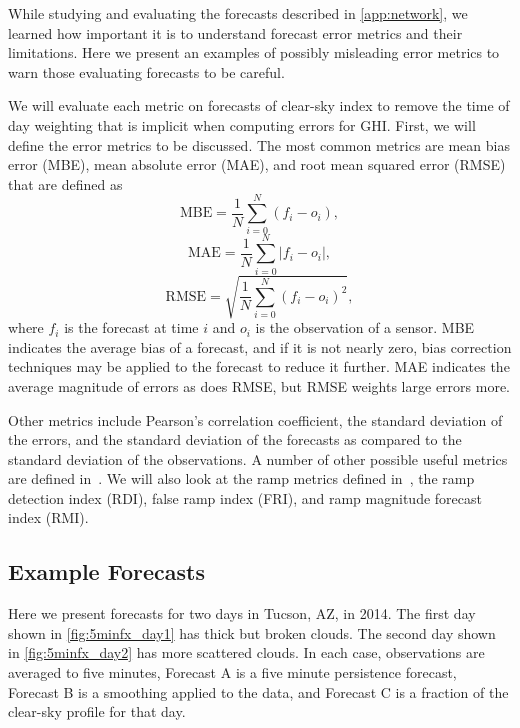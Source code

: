 While studying and evaluating the forecasts described in
\cref{app:network}, we learned how important it is to understand
forecast error metrics and their limitations.
Here we present an examples of possibly misleading error metrics to
warn those evaluating forecasts to be careful.

We will evaluate each metric on forecasts of clear-sky index to remove
the time of day weighting that is implicit when computing errors for
GHI.
First, we will define the error metrics to be discussed.
The most common metrics are mean bias error (MBE), mean absolute error
(MAE), and root mean squared error (RMSE) that are defined as
\begin{equation}
\mbox{MBE} = \frac{1}{N} \sum_{i=0}^N (f_i - o_i),
\end{equation}
\begin{equation}
\mbox{MAE} = \frac{1}{N} \sum_{i=0}^N |f_i - o_i|,
\end{equation}
\begin{equation}
\mbox{RMSE} = \sqrt{\frac{1}{N} \sum_{i=0}^N (f_i - o_i)^2},
\end{equation}
where $f_i$ is the forecast at time $i$ and $o_i$ is the observation
of a sensor.
MBE indicates the average bias of a forecast, and if it is not nearly
zero, bias correction techniques may be applied to the forecast to
reduce it further.
MAE indicates the average magnitude of errors as does RMSE, but RMSE
weights large errors more.

Other metrics include Pearson's correlation coefficient, the standard
deviation of the errors, and the standard deviation of the forecasts
as compared to the standard deviation of the observations.
A number of other possible useful metrics are defined
in~\cite{Zhang2015}.
We will also look at the ramp metrics defined in~\cite{Chu2015b}, the
ramp detection index (RDI), false ramp index (FRI), and ramp
magnitude forecast index (RMI).

\subsection{Example Forecasts}
Here we present forecasts for two days in Tucson, AZ, in 2014.
The first day shown in \cref{fig:5minfx_day1} has thick but broken
clouds.
The second day shown in \cref{fig:5minfx_day2} has more scattered
clouds.
In each case, observations are averaged to five minutes, Forecast A is
a five minute persistence forecast, Forecast B is a smoothing applied
to the data, and Forecast C is a fraction of the clear-sky profile for
that day.


